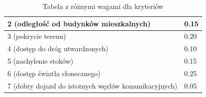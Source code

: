 \documentclass{article}
\begin{document}
\begin{table}[ht]
\begin{minipage}{0.48\textwidth}
\begin{tabular}{|p{4cm}|p{1cm}|}
        2 (odległość od budynków mieszkalnych) & 0.15\\
        \hline
        3 (pokrycie terenu) & 0.20\\
        \hline
        4 (dostęp do dróg utwardzonych) & 0.10\\
        \hline
        5 (nachylenie stoków) & 0.15\\    
        \hline
        6 (dostęp światła słonecznego) & 0.25\\
        \hline
        7 (dobry dojazd do istotnych węzłów komunikacyjnych) & 0.05\\
        \hline
        \end{tabular}
        \caption{Tabela z różnymi wagami dla kryteriów}
        \label{tab:bdot_costs_different}
    \end{minipage}
\end{table}
\end{document}
